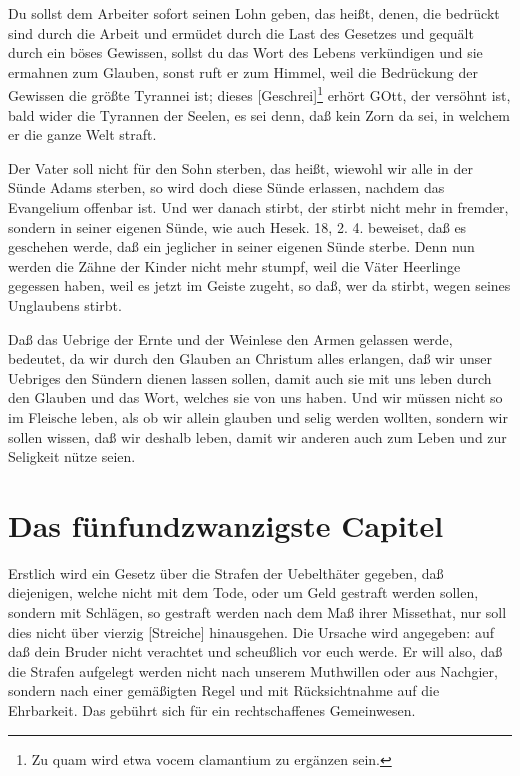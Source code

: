 Du sollst dem Arbeiter sofort seinen Lohn geben, das heißt, denen, die bedrückt sind durch die Arbeit und ermüdet durch die Last des Gesetzes und gequält durch ein böses Gewissen, sollst du das Wort des Lebens verkündigen und sie ermahnen zum Glauben, sonst ruft er zum Himmel, weil die Bedrückung der Gewissen die größte Tyrannei ist; dieses [Geschrei]\footnote{Zu quam wird etwa vocem clamantium zu ergänzen sein.} erhört GOtt, der versöhnt ist, bald wider die Tyrannen der Seelen, es sei denn, daß kein Zorn da sei, in welchem er die ganze Welt straft.

Der Vater soll nicht für den Sohn sterben, das heißt, wiewohl wir alle in der Sünde Adams sterben, so wird doch diese Sünde erlassen, nachdem das Evangelium offenbar ist. Und wer danach stirbt, der stirbt nicht mehr in fremder, sondern in seiner eigenen Sünde, wie auch Hesek. 18, 2. 4. beweiset, daß es geschehen werde, daß ein jeglicher in seiner eigenen Sünde sterbe. Denn nun werden die Zähne der Kinder nicht mehr stumpf, weil die Väter Heerlinge gegessen haben, weil es jetzt im Geiste zugeht, so daß, wer da stirbt, wegen seines Unglaubens stirbt.

Daß das Uebrige der Ernte und der Weinlese den Armen gelassen werde, bedeutet, da wir durch den Glauben an Christum alles erlangen, daß wir unser Uebriges den Sündern dienen lassen sollen, damit auch sie mit uns leben durch den Glauben und das Wort, welches sie von uns haben. Und wir müssen nicht so im Fleische leben, als ob wir allein glauben und selig werden wollten, sondern wir sollen wissen, daß wir deshalb leben, damit wir anderen auch zum Leben und zur Seligkeit nütze seien.

\section{Das fünfundzwanzigste Capitel}

Erstlich wird ein Gesetz über die Strafen der Uebelthäter gegeben, daß diejenigen, welche nicht mit dem Tode, oder um Geld gestraft werden sollen, sondern mit Schlägen, so gestraft werden nach dem Maß ihrer Missethat, nur soll dies nicht über vierzig [Streiche] hinausgehen. Die Ursache wird angegeben: auf daß dein Bruder nicht verachtet und scheußlich vor euch werde. Er will also, daß die Strafen aufgelegt werden nicht nach unserem Muthwillen oder aus Nachgier, sondern nach einer gemäßigten Regel und mit Rücksichtnahme auf die Ehrbarkeit. Das gebührt sich für ein rechtschaffenes Gemeinwesen.

